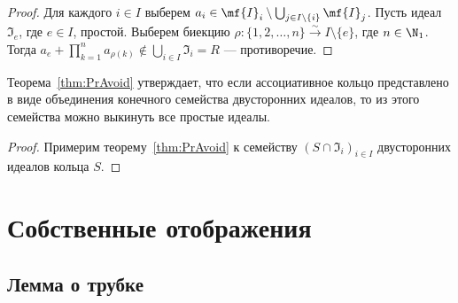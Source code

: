 \documentclass[
	extrafontsizes,
	11pt,
	hyphens,
]{memoir}
\begin{document}
\begin{proof}
Для каждого \(i \in I\) выберем \(a_i \in \mf{I}_i \setminus \bigcup_{j \in I \setminus \{i\}} \mf{I}_j\).
Пусть идеал \(\mathfrak{I}_e\), где \(e \in I\), простой.
Выберем биекцию \(\rho : \{1,2,\dots{},n\} \xrightarrow{\sim} I \setminus \{e\}\), где \(n \in \N_1\).
Тогда \(a_e + \prod_{k = 1}^n a_{\rho(k)} \notin \bigcup_{i \in I} \mathfrak{I}_i = R\) --- противоречие.
\end{proof}

\begin{remark}
Теорема~\ref{thm:PrAvoid} утверждает, что если ассоциативное кольцо представлено в виде объединения конечного семейства двусторонних идеалов, то из этого семейства можно выкинуть все простые идеалы.
\end{remark}


\begin{proof}
Примерим теорему~\ref{thm:PrAvoid} к семейству \((S \cap \mathfrak{I}_i)_{i \in I}\) двусторонних идеалов кольца \(S\).
\end{proof}


\section{Собственные отображения}

\subsection{Лемма о трубке}


\end{document}
